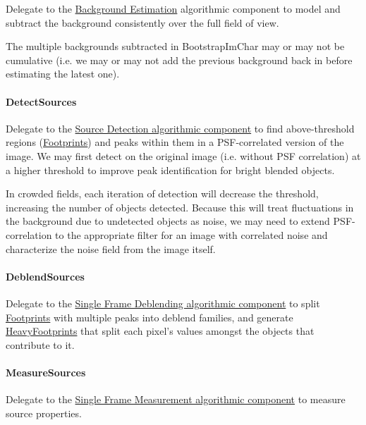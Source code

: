 Delegate to the \hyperref[sec:acBackgroundEstimation]{Background Estimation} algorithmic component to model and subtract the background consistently over the full field of view.

The multiple backgrounds subtracted in BootstrapImChar may or may not be cumulative (i.e. we may or may not add the previous background back in before estimating the latest one).

\paragraph{DetectSources}
\label{sec:drpBootstrapImChar_DetectSources}

Delegate to the \hyperref[sec:acSourceDetection]{Source Detection algorithmic component} to find above-threshold regions (\hyperref[sec:spFootprints]{Footprints}) and peaks within them in a PSF-correlated version of the image.  We may first detect on the original image (i.e. without PSF correlation) at a higher threshold to improve peak identification for bright blended objects.

In crowded fields, each iteration of detection will decrease the threshold, increasing the number of objects detected.  Because this will treat fluctuations in the background due to undetected objects as noise, we may need to extend PSF-correlation to the appropriate filter for an image with correlated noise and characterize the noise field from the image itself.

\paragraph{DeblendSources}
\label{sec:drpBootstrapImChar_DeblendSources}

Delegate to the \hyperref[sec:acSingleFrameDeblending]{Single Frame Deblending algorithmic component} to split \hyperref[sec:spFootprints]{Footprints} with multiple peaks into deblend families, and generate \hyperref[sec:spFootprintsHeavy]{HeavyFootprints} that split each pixel's values amongst the objects that contribute to it.

\paragraph{MeasureSources}
\label{sec:drpBootstrapImChar_MeasureSources}

Delegate to the \hyperref[sec:acSingleFrameMeasurement]{Single Frame Measurement algorithmic component} to measure source properties.

